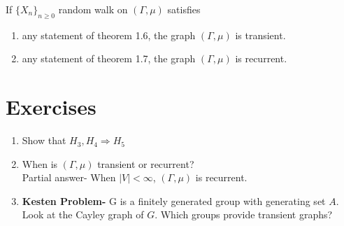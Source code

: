 \documentclass[main]{subfiles}
\begin{document}
\begin{definition} If $\{X_n\}_{n \geq 0}$ random walk on $(\Gamma, \mu)$ satisfies
  \begin{enumerate}
    \item any statement of theorem 1.6, the graph $(\Gamma, \mu)$ is transient.\\
    \item any statement of theorem 1.7, the graph $(\Gamma, \mu)$ is recurrent.\\
  \end{enumerate} \end{definition}

\section{Exercises}
\begin{enumerate}
  \item Show that $H_{3},H_{4} \Rightarrow H_{5} $\\
  \item When is $(\Gamma, \mu)$ transient or recurrent?\\
        Partial answer- When $|V| < \infty$, $(\Gamma, \mu)$ is recurrent. \\
  \item \textbf{Kesten Problem-} G is a finitely generated group with generating set $A$.
        Look at the Cayley graph of $G$. Which groups provide transient graphs? \\

\end{enumerate}
\end{document}
